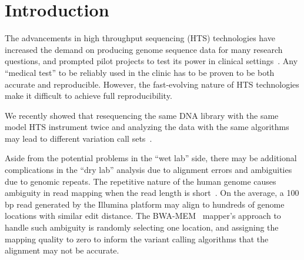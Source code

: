 \documentclass{bioinfo}
\newcommand{\junk}[1]{}
\begin{document}
\maketitle
\linenumbers
\section{Introduction}

The advancements in high throughput sequencing (HTS) technologies have increased the demand on producing genome sequence data for many research questions, and prompted pilot projects to test its
power in clinical settings~\citep{Biesecker2009}. Any ``medical test'' to be reliably used in the clinic has to be proven to be both accurate and reproducible.
However, the fast-evolving nature of HTS technologies make it difficult to achieve full reproducibility. %

We recently showed that 
resequencing the same DNA library 
with the same model HTS instrument 
twice 
and analyzing the data with the same algorithms 
may lead to different variation call sets~\citep{Kavak2015}. 
\junk{
There may be multiple reasons for this effect,
such as degradation of DNA between two sequencing experiments, signal processing and base calling errors during sequencing, or different GC biases introduced while making sequencing libraries from the
same DNA~\citep{Kavak2015}. 
}
Aside from the potential problems in the ``wet lab'' side,
there may be additional complications in the ``dry lab'' analysis due to alignment errors and ambiguities due to genomic repeats.
The repetitive nature of the  human genome causes ambiguity in read mapping when the read length is short~\citep{Treangen2012}. On the average, a 100 bp read generated by the Illumina platform may align to hundreds of genome locations with similar edit distance. 
The BWA-MEM~\citep{Li2013} mapper's  approach to handle such ambiguity is randomly selecting one location, and assigning the mapping quality to zero to inform the variant calling algorithms that the alignment may not be accurate. 
\end{document}
